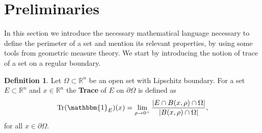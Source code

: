 \documentclass[artcle, 11pt, reqno]{amsart}
\numberwithin{equation}{section}
\newcommand{\R}{\mathbb{R}}
\newcommand{\ind}{\mathbbm{1}}
\DeclareMathOperator{\Tr}{Tr}
\theoremstyle{plain}
\theoremstyle{definition}
\newtheorem{definition}[theorem]{Definition}
\newtheorem{remark}[theorem]{Remark}
\theoremstyle{remark}
\begin{document}
	
	
	
	\section{Preliminaries} \label{sec:prelim}
	In this section we introduce the necessary mathematical language necessary to define the perimeter of a set and mention its relevant properties, by using some tools from geometric measure theory.
	We start by introducing the notion of trace of a set on a regular boundary.
	
	\begin{definition} \label{def:trace}
		Let $\Omega\subset\R^n$ be an open set with Lipschitz boundary.
		For a set $E \subset \R^n$ and $x \in \R^n$ the \textbf{Trace} of $E$ on $\partial \Omega$ is defined as
		\[
		\Tr(\ind_E)(x) =  \lim_{\rho \rightarrow 0^+} \frac{|E \cap B(x, \rho) \cap \Omega|}{|B(x, \rho) \cap \Omega|},
		\]
		for all $x\in\partial\Omega$.
	\end{definition}
	
	
\end{document}

